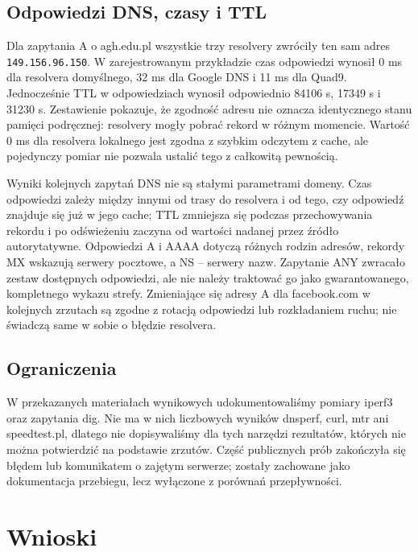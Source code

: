 \documentclass[11pt,a4paper]{article}
\begin{document}
\subsection{Odpowiedzi DNS, czasy i TTL}

Dla zapytania A o agh.edu.pl wszystkie trzy resolvery zwróciły ten sam adres
\texttt{149.156.96.150}. W zarejestrowanym przykładzie czas odpowiedzi wynosił
0 ms dla resolvera domyślnego, 32 ms dla Google DNS i 11 ms dla Quad9.
Jednocześnie TTL w odpowiedziach wynosił odpowiednio 84106 s, 17349 s i
31230 s. Zestawienie pokazuje, że zgodność adresu nie oznacza identycznego
stanu pamięci podręcznej: resolvery mogły pobrać rekord w różnym momencie.
Wartość 0 ms dla resolvera lokalnego jest zgodna z szybkim odczytem z cache,
ale pojedynczy pomiar nie pozwala ustalić tego z całkowitą pewnością.

Wyniki kolejnych zapytań DNS nie są stałymi parametrami domeny. Czas odpowiedzi
zależy między innymi od trasy do resolvera i od tego, czy odpowiedź znajduje
się już w jego cache; TTL zmniejsza się podczas przechowywania rekordu i po
odświeżeniu zaczyna od wartości nadanej przez źródło autorytatywne. Odpowiedzi
A i AAAA dotyczą różnych rodzin adresów, rekordy MX wskazują serwery pocztowe,
a NS -- serwery nazw. Zapytanie ANY zwracało zestaw dostępnych odpowiedzi, ale
nie należy traktować go jako gwarantowanego, kompletnego wykazu strefy.
Zmieniające się adresy A dla facebook.com w kolejnych zrzutach są zgodne
z rotacją odpowiedzi lub rozkładaniem ruchu; nie świadczą same w sobie o błędzie
resolvera.

\subsection{Ograniczenia}

W przekazanych materiałach wynikowych udokumentowaliśmy pomiary iperf3 oraz
zapytania dig. Nie ma w nich liczbowych wyników dnsperf, curl, mtr ani
speedtest.pl, dlatego nie dopisywaliśmy dla tych narzędzi rezultatów, których
nie można potwierdzić na podstawie zrzutów. Część publicznych prób zakończyła
się błędem lub komunikatem o zajętym serwerze; zostały zachowane jako
dokumentacja przebiegu, lecz wyłączone z porównań przepływności.

\section*{Wnioski}
\end{document}
